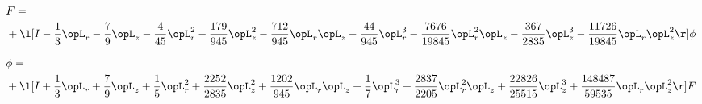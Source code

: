\begin{alignat}{2} 
\label{eq:transport3D_0} 
& F = \\ 
& + \l[ I - \frac{1}{3} \opL_r - \frac{7}{9} \opL_z - \frac{4}{45} \opL_r^{2} - \frac{179}{945} \opL_z^{2} - \frac{712}{945} \opL_r \opL_z - \frac{44}{945} \opL_r^{3} - \frac{7676}{19845} \opL_r^{2} \opL_z - \frac{367}{2835} \opL_z^{3} - \frac{11726}{19845} \opL_r \opL_z^{2}  \r] \phi \nonumber \\ 
\end{alignat} 


\begin{alignat}{2} 
\label{eq:scalarFlux_6} 
& \phi = \\ 
& + \l[ I + \frac{1}{3} \opL_r + \frac{7}{9} \opL_z + \frac{1}{5} \opL_r^{2} + \frac{2252}{2835} \opL_z^{2} + \frac{1202}{945} \opL_r \opL_z + \frac{1}{7} \opL_r^{3} + \frac{2837}{2205} \opL_r^{2} \opL_z + \frac{22826}{25515} \opL_z^{3} + \frac{148487}{59535} \opL_r \opL_z^{2}  \r] F \nonumber \\ 
\end{alignat} 


